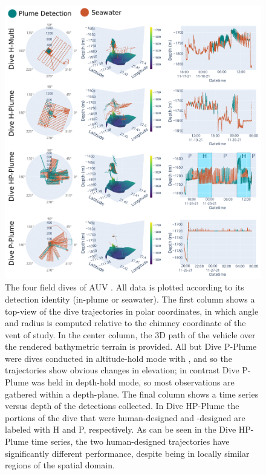 \begin{figure}[h!]
    \centering
    \includegraphics[width=1\columnwidth]{figures/detections_data.png}
    \caption{The four field dives of AUV \Sentry. All data is plotted according to its detection identity (in-plume or seawater). The first column shows a top-view of the dive trajectories in polar coordinates, in which angle and radius is computed relative to the chimney coordinate of the vent of study. In the center column, the 3D path of the vehicle over the rendered bathymetric terrain is provided. All but Dive P-Plume were dives conducted in altitude-hold mode with \Sentry, and so the trajectories show obvious changes in elevation; in contrast Dive P-Plume was held in depth-hold mode, so most observations are gathered within a depth-plane. The final column shows a time series versus depth of the detections collected. In Dive HP-Plume the portions of the dive that were human-designed and \PHORTEX-designed are labeled with H and P, respectively. As can be seen in the Dive HP-Plume time series, the two human-designed trajectories have significantly different performance, despite being in locally similar regions of the spatial domain. }
    \label{fig:field_results}
\end{figure}

